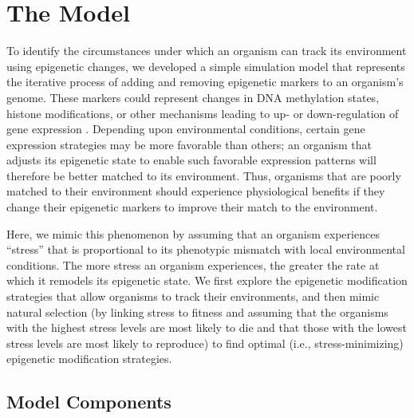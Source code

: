 \documentclass{article}
\begin{document}
\section*{The Model}
To identify the circumstances under which an organism can track its environment using epigenetic changes, we developed a simple simulation model that represents the iterative process of adding and removing epigenetic markers to an organism's genome. These markers could represent changes in DNA methylation states, histone modifications, or other mechanisms leading to up- or down-regulation of gene expression \cite{eirin2019marine}. Depending upon environmental conditions, certain gene expression strategies may be more favorable than others; an organism that adjusts its epigenetic state to enable such favorable expression patterns will therefore be better matched to its environment. Thus, organisms that are poorly matched to their environment should experience physiological benefits if they change their epigenetic markers to improve their match to the environment.

Here, we mimic this phenomenon by assuming that an organism experiences ``stress'' that is proportional to its phenotypic mismatch with local environmental conditions. The more stress an organism experiences, the greater the rate at which it remodels its epigenetic state. We first explore the epigenetic modification strategies that allow organisms to track their environments, and then mimic natural selection (by linking stress to fitness and assuming that the organisms with the highest stress levels are most likely to die and that those with the lowest stress levels are most likely to reproduce) to find optimal (i.e., stress-minimizing) epigenetic modification strategies.

\subsection{Model Components}
\end{document}
